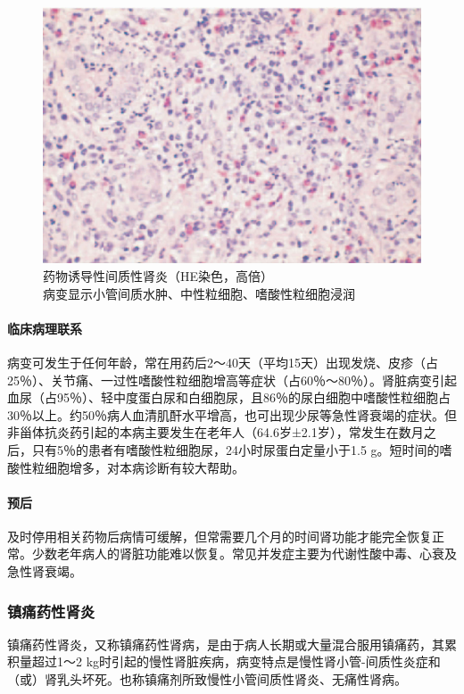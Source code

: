 \begin{figure}[!htbp]
 \centering
 \includegraphics{./images/Image00177.jpg}
 \captionsetup{justification=centering}
 \caption{药物诱导性间质性肾炎（HE染色，高倍）\\ {\small 病变显示小管间质水肿、中性粒细胞、嗜酸性粒细胞浸润}}
\label{fig10-28}
  \end{figure}

\paragraph{临床病理联系}
病变可发生于任何年龄，常在用药后2～40天（平均15天）出现发烧、皮疹（占25％）、关节痛、一过性嗜酸性粒细胞增高等症状（占60％～80％）。肾脏病变引起血尿（占95％）、轻中度蛋白尿和白细胞尿，且86％的尿白细胞中嗜酸性粒细胞占30％以上。约50％病人血清肌酐水平增高，也可出现少尿等急性肾衰竭的症状。但非甾体抗炎药引起的本病主要发生在老年人（64.6岁±2.1岁），常发生在数月之后，只有5％的患者有嗜酸性粒细胞尿，24小时尿蛋白定量小于1.5
g。短时间的嗜酸性粒细胞增多，对本病诊断有较大帮助。

\paragraph{预后}
及时停用相关药物后病情可缓解，但常需要几个月的时间肾功能才能完全恢复正常。少数老年病人的肾脏功能难以恢复。常见并发症主要为代谢性酸中毒、心衰及急性肾衰竭。

\subsubsection{镇痛药性肾炎}

镇痛药性肾炎，又称镇痛药性肾病，是由于病人长期或大量混合服用镇痛药，其累积量超过1～2
kg时引起的慢性肾脏疾病，病变特点是慢性肾小管-间质性炎症和（或）肾乳头坏死。也称镇痛剂所致慢性小管间质性肾炎、无痛性肾病。

